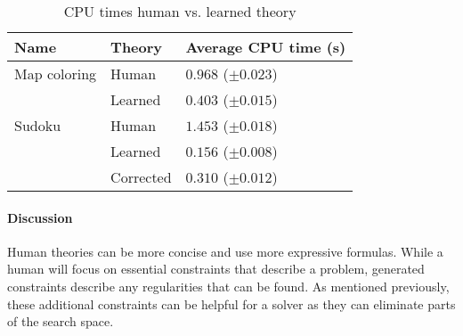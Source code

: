 \begin{experiment}[\textsc{Speed}]


	\begin{table}[!htp]
		\begin{tabularx}{\textwidth}{XX|X}
			\textbf{Name} & \textbf{Theory} & \textbf{Average CPU time (s)} \\
			\toprule
			Map coloring & Human & $0.968$ 	($\pm 0.023$) \\
			& Learned & $0.403$ 			($\pm 0.015$) \\
			\midrule
			Sudoku & Human & $1.453$ 		($\pm 0.018$) \\ 
			& Learned & $0.156$ 			($\pm 0.008$) \\
			& Corrected & $0.310$ 			($\pm 0.012$)
		\end{tabularx}
		\caption{CPU times human vs. learned theory}
		\label{tbl:speed_human_machine}
	\end{table}

\end{experiment}

\paragraph{Discussion}
Human theories can be more concise and use more expressive formulas.
While a human will focus on essential constraints that describe a problem, generated constraints describe any regularities that can be found.
As mentioned previously, these additional constraints can be helpful for a solver as they can eliminate parts of the search space.

